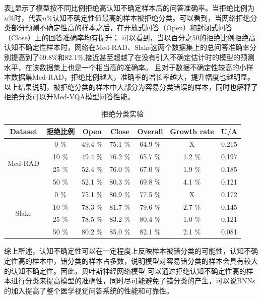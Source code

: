 表\ref{reject_exm}显示了模型按不同比例拒绝高认知不确定样本后的问答准确率。当拒绝比例为$n \%$时，代表$n \%$认知不确定性值最高的样本被拒绝分类。可以看到，当网络拒绝分类部分预测不确定性高的样本之后，在开放式问答（Open）和封闭式问答（Close）上的回答准确率均有提升；
可以看到，当以百分之50的拒绝比例拒绝高认知不确定性样本时，网络在Med-RAD、Slake这两个数据集上的总问答准确率分别提高到了69.8\%和82.1\%,接近甚至超越了在没有引入不确定估计时的模型的预测水平，在该数据集上也是一个相当高的准确率。
且对于数据不确定性较高的小样本数据集Med-RAD，拒绝比例越大，准确率的增长率越大，提升幅度也越明显。以上结果说明，被拒绝分类的样本中大部分为容易分类错误的样本，同时也解释了拒绝分类可以升Med-VQA模型问答性能。
\begin{table}
	\caption{\label{reject_exm}拒绝分类实验}
	\centering
	\small %
	\begin{tabular}{c|c|ccccc}
		\hline Dataset & 拒绝比例 & Open &  Close & Overall & Growth rate & U/A \\
		\hline \multirow{4}{*}{Med-RAD} & 0 \%& 49.4 \%& 75.1 \%& 64.9 \%& X& 0.215 \\
		& 10 \%& 49.4 \%& 76.2 \%& 65.7 \%& 1.2 \% & 0.197 \\
		& 25 \%& 52.4 \%& 76.0 \%& 67.0 \%& 1.9 \% & 0.185 \\
		& 50 \%& 52.1 \%& 80.3 \%& 69.8 \%& 4.1 \% & 0.121 \\
		\hline \multirow{4}{*}{Slake} & 0 \%& 75.1 \%& 80.9 \%& 77.5 \%& X& 0.172 \\
		& 10 \%& 78.3 \%& 81.7 \%& 79.6 \%& 2.7 \% & 0.145 \\
		& 25 \%& 78.5 \%& 83.2 \%& 80.4 \%& 1.0 \% & 0.121 \\
		& 50 \%& 80.2 \%& 85.0 \%& 82.1 \%& 2.1 \% & 0.081 \\
		\hline
	\end{tabular}
\end{table}

综上所述，认知不确定性可以在一定程度上反映样本被错分类的可能性，认知不确定性高的样本中，错分类的样本占多数，说明模型对容易错分类的样本会具有较大的认知不确定性。因此，贝叶斯神经网络模型
可以通过拒绝认知不确定性高的样本进行分类来提高模型的准确性，同时尽可能避免了错分类的产生，可以说BNNs的加入提高了整个医学视觉问答系统的性能和可靠性。

